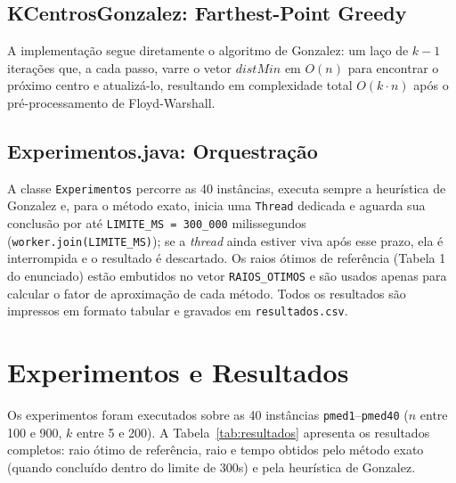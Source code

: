 \documentclass[10pt,twocolumn]{article}
\begin{document}
\subsection{KCentrosGonzalez: Farthest-Point Greedy}

A implementa\c{c}\~ao segue diretamente o algoritmo de Gonzalez: um la\c{c}o de $k-1$
itera\c{c}\~oes que, a cada passo, varre o vetor $\mathit{distMin}$ em $O(n)$ para
encontrar o pr\'oximo centro e atualiz\'a-lo, resultando em complexidade total
$O(k \cdot n)$ ap\'os o pr\'e-processamento de Floyd-Warshall.

\subsection{Experimentos.java: Orquestra\c{c}\~ao}

A classe \texttt{Experimentos} percorre as 40 inst\^ancias, executa sempre a
heur\'istica de Gonzalez e, para o m\'etodo exato, inicia uma \texttt{Thread} dedicada e
aguarda sua conclus\~ao por at\'e \texttt{LIMITE\_MS = 300\_000} milissegundos
(\texttt{worker.join(LIMITE\_MS)}); se a \emph{thread} ainda estiver viva ap\'os esse
prazo, ela \'e interrompida e o resultado \'e descartado. Os raios \'otimos de
refer\^encia (Tabela 1 do enunciado) est\~ao embutidos no vetor \texttt{RAIOS\_OTIMOS} e
s\~ao usados apenas para calcular o fator de aproxima\c{c}\~ao de cada m\'etodo. Todos os
resultados s\~ao impressos em formato tabular e gravados em \texttt{resultados.csv}.

\section{Experimentos e Resultados}

Os experimentos foram executados sobre as 40 inst\^ancias \texttt{pmed1}--\texttt{pmed40}
($n$ entre 100 e 900, $k$ entre 5 e 200). A Tabela~\ref{tab:resultados} apresenta os
resultados completos: raio \'otimo de refer\^encia, raio e tempo obtidos pelo m\'etodo
exato (quando conclu\'ido dentro do limite de 300s) e pela heur\'istica de Gonzalez.
\end{document}
